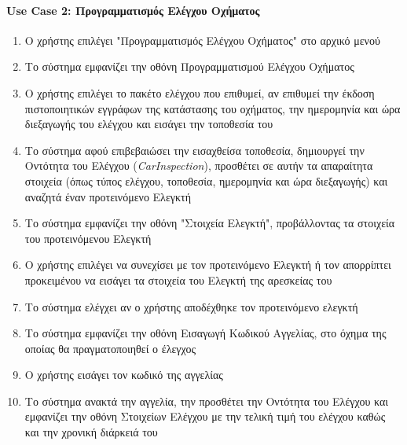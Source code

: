\documentclass{../ol-softwaremanual}
\begin{document}
	
	
	
	
	\newpage
	
	
	\paragraph{\en Use Case 2: \gr Προγραμματισμός Ελέγχου Οχήματος}
	
	\begin{enumerate}
		\item Ο χρήστης επιλέγει \en"\gr Προγραμματισμός Ελέγχου Οχήματος\en" \gr στο αρχικό μενού
		\item Το σύστημα εμφανίζει την οθόνη Προγραμματισμού Ελέγχου Οχήματος
		\item Ο χρήστης επιλέγει το πακέτο ελέγχου που επιθυμεί, αν επιθυμεί την έκδοση πιστοποιητικών εγγράφων της κατάστασης του οχήματος, την ημερομηνία και ώρα διεξαγωγής του ελέγχου και εισάγει την τοποθεσία του
		\item Το σύστημα αφού επιβεβαιώσει την εισαχθείσα τοποθεσία, δημιουργεί την Οντότητα του Ελέγχου (\en \textit{CarInspection}\gr), προσθέτει σε αυτήν τα απαραίτητα στοιχεία (όπως τύπος ελέγχου, τοποθεσία, ημερομηνία και ώρα διεξαγωγής) και αναζητά έναν προτεινόμενο Ελεγκτή
		\item Το σύστημα εμφανίζει την οθόνη \en"\gr Στοιχεία Ελεγκτή\en"\gr, προβάλλοντας τα στοιχεία του προτεινόμενου Ελεγκτή		
		\item Ο χρήστης επιλέγει να συνεχίσει με τον προτεινόμενο Ελεγκτή ή τον απορρίπτει προκειμένου να εισάγει τα στοιχεία του Ελεγκτή της αρεσκείας του
		\item Το σύστημα ελέγχει αν ο χρήστης αποδέχθηκε τον προτεινόμενο ελεγκτή
		\item Το σύστημα εμφανίζει την οθόνη Εισαγωγή Κωδικού Αγγελίας, στο όχημα της οποίας θα πραγματοποιηθεί ο έλεγχος		
		\item Ο χρήστης εισάγει τον κωδικό της αγγελίας
		\item Το σύστημα ανακτά την αγγελία, την προσθέτει την Οντότητα του Ελέγχου και εμφανίζει την οθόνη Στοιχείων Ελέγχου με την τελική τιμή του ελέγχου καθώς και την χρονική διάρκειά του

\end{enumerate}
\end{document}
